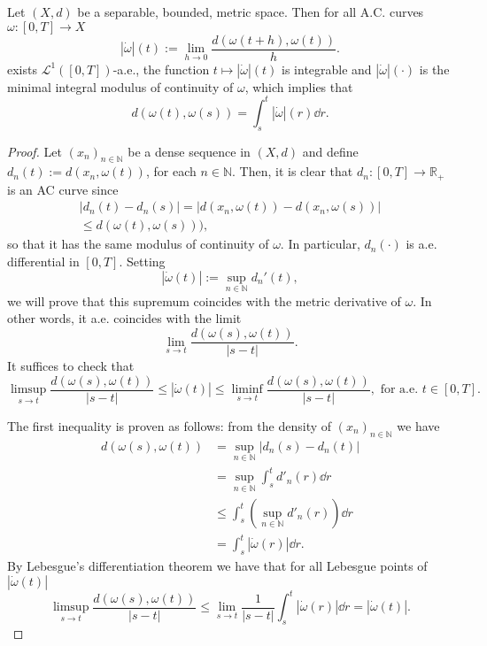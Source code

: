 \begin{theorem}
	\label{theorem.AC_metric_derivative}
	Let $(X,d)$ be a separable, bounded, metric space. Then for all A.C. curves $\omega :[0,T] \to X$
	\begin{equation*}
	|\dot{\omega}|(t) := \lim_{h \to 0} \frac{d(\omega(t+h), \omega(t))}{h}.
	\end{equation*}
	exists $\mathcal{L}^1([0,T])$-a.e., the function $t \mapsto |\dot{\omega}|(t)$ is integrable and $|\dot{\omega}|(\cdot)$ is the minimal integral modulus of continuity of $\omega$, which implies that 
	\begin{equation}
	d(\omega(t),\omega(s)) = \int_s^t |\dot{\omega}|(r)\dd r.
	\end{equation} 
\end{theorem}
\begin{proof}
	Let $\left(x_n\right)_{n \in \mathbb{N}}$ be a dense sequence in $(X,d)$ and define $d_n(t):= d(x_n, \omega(t))$, for each $n \in \mathbb{N}$. Then, it is clear that $d_n : [0,T] \to \mathbb{R}_+$ is an AC curve since 
	\begin{align*}
		|d_n(t) - d_n(s)| = |d(x_n, \omega(t)) - d(x_n, \omega(s))|\\
		\le d(\omega(t),\omega(s))), 
	\end{align*} 
	so that it has the same modulus of continuity of $\omega$. In particular, $d_n(\cdot)$ is a.e. differential in $[0,T]$. Setting 
	\begin{equation*}
		|\dot{\omega}(t)| := \sup_{n \in \mathbb{N}} d_n'(t),
	\end{equation*}
	we will prove that this supremum coincides with the metric derivative of $\omega$. In other words, it a.e. coincides with the limit 
	\begin{equation*}
		\lim_{s \to t} \frac{d(\omega(s), \omega(t))}{|s - t|}.
	\end{equation*}
	It suffices to check that 
	\begin{equation*}
		\limsup_{s \to t} \frac{d(\omega(s), \omega(t))}{|s - t|} \le |\dot{\omega}(t)| \le \liminf_{s \to t} \frac{d(\omega(s), \omega(t))}{|s - t|}, \text{ for a.e. $t \in [0,T]$.}
	\end{equation*}
	
	The first inequality is proven as follows: from the density of $(x_n)_{n \in \mathbb{N}}$ we have 
	\begin{align*}
		d(\omega(s), \omega(t)) 
		&= \sup_{n \in \mathbb{N}} |d_n(s) - d_n(t)|\\ 
		&= \sup_{n \in \mathbb{N}} \int_s^td'_n(r) \dd r\\
		&\le \int_s^t \left(\sup_{n \in \mathbb{N}} d'_n(r)\right)\dd r\\
		&= \int_s^t |\dot{\omega}(r)|\dd r.
	\end{align*}
	By Lebesgue's differentiation theorem we have that for all Lebesgue points of $|\dot{\omega}(t)|$
	\begin{equation*}
		\limsup_{s \to t} \frac{d(\omega(s), \omega(t))}{|s - t|} \le \lim_{s \to t} \frac{1}{|s - t|} \int_s^t |\dot{\omega}(r)|\dd r = |\dot{\omega}(t)|. 
	\end{equation*}
	

\end{proof}
